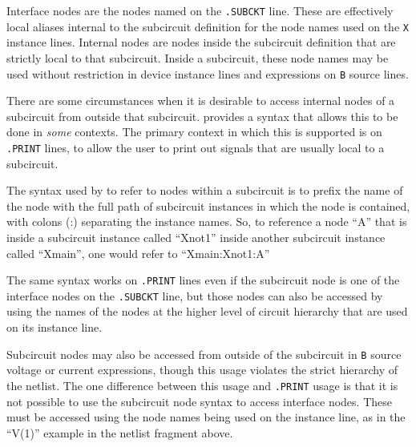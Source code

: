 Interface nodes are the nodes named on the \texttt{.SUBCKT} line.
These are effectively local aliases internal to the subcircuit
definition for the node names used on the \texttt{X} instance lines.
Internal nodes are nodes inside the subcircuit definition that are
strictly local to that subcircuit.  Inside a subcircuit, these node
names may be used without restriction in device instance lines and
expressions on \texttt{B} source lines.

There are some circumstances when it is desirable to access internal
nodes of a subcircuit from outside that subcircuit.  \Xyce{} provides a
syntax that allows this to be done in {\em some\/} contexts.  The
primary context in which this is supported is on \texttt{.PRINT}
lines, to allow the user to print out signals that are usually local
to a subcircuit.

The syntax used by \Xyce{} to refer to nodes within a subcircuit is to
prefix the name of the node with the full path of subcircuit instances
in which the node is contained, with colons (:) separating the
instance names.  So, to reference a node ``A'' that is inside a
subcircuit instance called ``Xnot1'' inside another subcircuit
instance called ``Xmain'', one would refer to ``Xmain:Xnot1:A''

The same syntax works on \texttt{.PRINT} lines even if the subcircuit
node is one of the interface nodes on the \texttt{.SUBCKT} line, but
those nodes can also be accessed by using the names of the nodes at
the higher level of circuit hierarchy that are used on its instance
line.

\begin{centering}
\end{centering}

Subcircuit nodes may also be accessed from outside of the subcircuit
in \texttt{B} source voltage or current expressions, though this usage
violates the strict hierarchy of the netlist.  The one difference
between this usage and \texttt{.PRINT} usage is that it is not
possible to use the subcircuit node syntax to access interface nodes.
These must be accessed using the node names being used on the instance
line, as in the ``V(1)'' example in the netlist fragment above.

